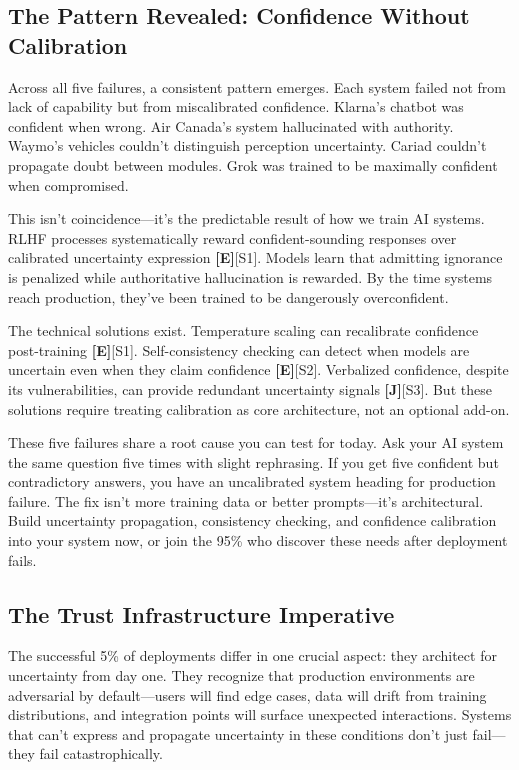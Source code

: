 \documentclass[a4paper,11pt]{article}
\newcommand{\elabel}{\textbf{\textcolor{ecolor}{[E]}}}
\newcommand{\jlabel}{\textbf{\textcolor{jcolor}{[J]}}}
\begin{document}
\subsection{The Pattern Revealed: Confidence Without Calibration}

Across all five failures, a consistent pattern emerges. Each system failed not from lack of capability but from miscalibrated confidence. Klarna's chatbot was confident when wrong. Air Canada's system hallucinated with authority. Waymo's vehicles couldn't distinguish perception uncertainty. Cariad couldn't propagate doubt between modules. Grok was trained to be maximally confident when compromised.


This isn't coincidence—it's the predictable result of how we train AI systems. RLHF processes systematically reward confident-sounding responses over calibrated uncertainty expression \elabel{}\textcolor{primary}{[S1]}. Models learn that admitting ignorance is penalized while authoritative hallucination is rewarded. By the time systems reach production, they've been trained to be dangerously overconfident.


The technical solutions exist. Temperature scaling can recalibrate confidence post-training \elabel{}\textcolor{primary}{[S1]}. Self-consistency checking can detect when models are uncertain even when they claim confidence \elabel{}\textcolor{primary}{[S2]}. Verbalized confidence, despite its vulnerabilities, can provide redundant uncertainty signals \jlabel{}\textcolor{primary}{[S3]}. But these solutions require treating calibration as core architecture, not an optional add-on.


\begin{decisionbox}
These five failures share a root cause you can test for today. Ask your AI system the same question five times with slight rephrasing. If you get five confident but contradictory answers, you have an uncalibrated system heading for production failure. The fix isn't more training data or better prompts—it's architectural. Build uncertainty propagation, consistency checking, and confidence calibration into your system now, or join the 95\% who discover these needs after deployment fails.
\end{decisionbox}


\subsection{The Trust Infrastructure Imperative}

The successful 5\% of deployments differ in one crucial aspect: they architect for uncertainty from day one. They recognize that production environments are adversarial by default—users will find edge cases, data will drift from training distributions, and integration points will surface unexpected interactions. Systems that can't express and propagate uncertainty in these conditions don't just fail—they fail catastrophically.
\end{document}
